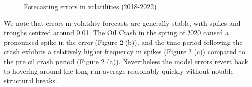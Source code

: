 \documentclass{article}
\begin{document}
\begin{figure}
    \centering

    \caption{Forecasting errors in volatilities (2018-2022)}
\end{figure}

We note that errors in volatility forecasts are generally stable, with spikes and troughs centred
around 0.01. The Oil Crash in the spring of 2020 caused a pronounced spike in the error (Figure 2 (b)), 
and the time period following the crash exhibits a relatively higher frequency in spikes (Figure 2 (c)) compared to
the pre oil crash period (Figure 2 (a)). Nevertheless the model errors revert back to hovering around
the long run average reasonably quickly without notable structural breaks.
\end{document}

